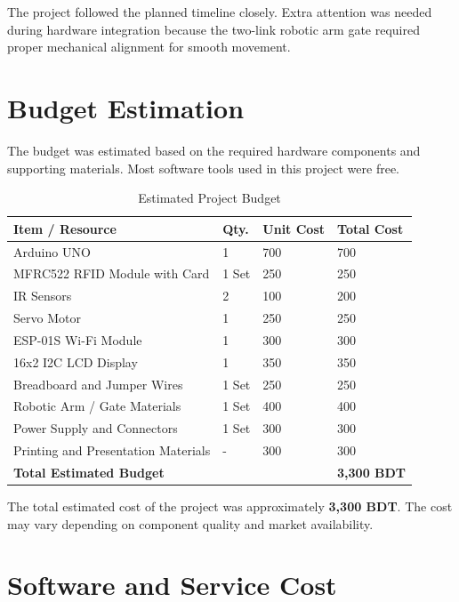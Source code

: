 The project followed the planned timeline closely. Extra attention was needed during hardware integration because the two-link robotic arm gate required proper mechanical alignment for smooth movement.

\section{Budget Estimation}

The budget was estimated based on the required hardware components and supporting materials. Most software tools used in this project were free.

\begin{table}[H]
\centering
\small
\renewcommand{\arraystretch}{1.15}
\caption{Estimated Project Budget}
\label{tab:project_budget}
\begin{tabular}{|p{}|p{}|p{}|p{}|}
\hline
\textbf{Item / Resource} & \textbf{Qty.} & \textbf{Unit Cost} & \textbf{Total Cost} \\
\hline
Arduino UNO & 1 & 700 & 700 \\
\hline
MFRC522 RFID Module with Card & 1 Set & 250 & 250 \\
\hline
IR Sensors & 2 & 100 & 200 \\
\hline
Servo Motor & 1 & 250 & 250 \\
\hline
ESP-01S Wi-Fi Module & 1 & 300 & 300 \\
\hline
16x2 I2C LCD Display & 1 & 350 & 350 \\
\hline
Breadboard and Jumper Wires & 1 Set & 250 & 250 \\
\hline
Robotic Arm / Gate Materials & 1 Set & 400 & 400 \\
\hline
Power Supply and Connectors & 1 Set & 300 & 300 \\
\hline
Printing and Presentation Materials & - & 300 & 300 \\
\hline
\textbf{Total Estimated Budget} &  &  & \textbf{3,300 BDT} \\
\hline
\end{tabular}
\normalsize
\end{table}

The total estimated cost of the project was approximately \textbf{3,300 BDT}. The cost may vary depending on component quality and market availability.

\section{Software and Service Cost}

